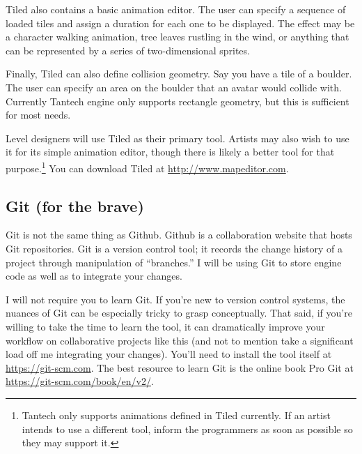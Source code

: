 \documentclass{article}
\begin{document}
Tiled also contains a basic animation editor. The user can specify a sequence of loaded tiles and assign a duration for each one to be displayed. The effect may be a character walking animation, tree leaves rustling in the wind, or anything that can be represented by a series of two-dimensional sprites.

Finally, Tiled can also define collision geometry. Say you have a tile of a boulder. The user can specify an area on the boulder that an avatar would collide with. Currently Tantech engine only supports rectangle geometry, but this is sufficient for most needs.

Level designers will use Tiled as their primary tool. Artists may also wish to use it for its simple animation editor, though there is likely a better tool for that purpose.\footnote{Tantech only supports animations defined in Tiled currently. If an artist intends to use a different tool, inform the programmers as soon as possible so they may support it.} You can download Tiled at \url{http://www.mapeditor.com}.

\subsection*{Git (for the brave)}
Git is not the same thing as Github. Github is a collaboration website that hosts Git repositories. Git is a version control tool; it records the change history of a project through manipulation of ``branches.'' I will be using Git to store engine code as well as to integrate your changes.

I will not require you to learn Git. If you're new to version control systems, the nuances of Git can be especially tricky to grasp conceptually. That said, if you're willing to take the time to learn the tool, it can dramatically improve your workflow on collaborative projects like this (and not to mention take a significant load off me integrating your changes). You'll need to install the tool itself at \url{https://git-scm.com}. The best resource to learn Git is the online book Pro Git at \url{https://git-scm.com/book/en/v2/}.
\end{document}
